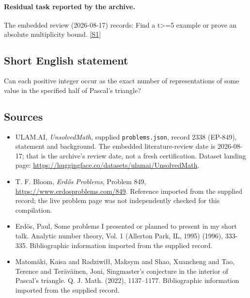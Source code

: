\documentclass[11pt,a4paper]{article}
\newcommand{\sref}[2]{\hyperlink{source:#1:#2}{[S#2]}}
\begin{document}
\paragraph{Residual task reported by the archive.}

The embedded review (2026-08-17) records: Find a t>=5 example or prove an absolute multiplicity bound. \sref{2338}{1}

\subsection{Short English statement}

Can each positive integer occur as the exact number of representations of some value in the specified half of Pascal's triangle?

\subsection{Sources}

{\small

\begin{itemize}

\item[\hypertarget{source:2338:1}{S1}] ULAM.AI, \emph{UnsolvedMath}, supplied \texttt{problems.json}, record 2338 (EP-849), statement and background. The embedded literature-review date is 2026-08-17; that is the archive’s review date, not a fresh certification. Dataset landing page: \url{https://huggingface.co/datasets/ulamai/UnsolvedMath}.

\item[\hypertarget{source:2338:2}{S2}] T. F. Bloom, \emph{Erdős Problems}, Problem 849, \url{https://www.erdosproblems.com/849}. Reference imported from the supplied record; the live problem page was not independently checked for this compilation.

\item[\hypertarget{source:2338:3}{S3}] Erd\"{o}s, Paul, Some problems I presented or planned to present in my short talk. Analytic number theory, Vol. 1 (Allerton Park, IL, 1995) (1996), 333-335. Bibliographic information imported from the supplied record.

\item[\hypertarget{source:2338:4}{S4}] Matom\"{a}ki, Kaisa and Radziwi\l\l, Maksym and Shao, Xuancheng and Tao, Terence and Ter\"{a}v\"{a}inen, Joni, Singmaster's conjecture in the interior of {P}ascal's triangle. Q. J. Math. (2022), 1137--1177. Bibliographic information imported from the supplied record.

\end{itemize}

}

\label{end:2338}
\end{document}
